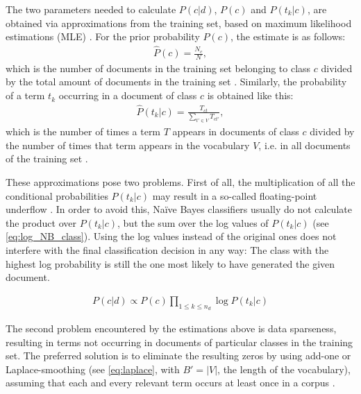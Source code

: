 The two parameters needed to calculate $P(c|d)$, $P(c)$ and $P(t_{k}|c)$, are obtained via approximations from the training set, based on maximum likelihood estimations (MLE) \citep{Manning2009, martin2018speech}. For the prior probability $P(c)$, the estimate is as follows:
\begin{gather}
    \hat{P}(c) = \frac{N_{c}}{N}\label{eq:prior_est},
\end{gather}
which is the number of documents in the training set belonging to class $c$ divided by the total amount of documents in the training set \citep{Manning2009, martin2018speech}. Similarly, the probability of a term $t_{k}$ occurring in a document of class $c$ is obtained like this:
\begin{gather}
    \hat{P}(t_{k}|c) = \frac{T_{ct}}{\sum_{t' \in V} T_{ct'}}\label{eq:likelihood_est},
\end{gather}
which is the number of times a term $T$ appears in documents of class $c$ divided by the number of times that term appears in the vocabulary $V$, i.e. in all documents of the training set \citep{martin2018speech, Manning2009}.

These approximations pose two problems. First of all, the multiplication of all the conditional probabilities $P(t_{k}|c)$ may result in a so-called floating-point underflow \citep{Manning2009}. In order to avoid this, Na\"ive Bayes classifiers usually do not calculate the product over $P(t_{k}|c)$, but the sum over the log values of $P(t_{k}|c)$ (see \eqref{eq:log_NB_class}). Using the log values instead of the original ones does not interfere with the final classification decision in any way: The class with the highest log probability is still the one most likely to have generated the given document.

\begin{gather}
    P(c|d) \propto P(c) \prod_{1 \leq k \leq n_{d}} \log P(t_{k}|c)\label{eq:log_NB_class}
\end{gather}

The second problem encountered by the estimations above is data sparseness, resulting in terms not occurring in documents of particular classes in the training set. The preferred solution is to eliminate the resulting zeros by using add-one or Laplace-smoothing (see \eqref{eq:laplace}, with $B' = |V|$, the length of the vocabulary), assuming that each and every relevant term occurs at least once in a corpus \citep{Manning2009}. %

